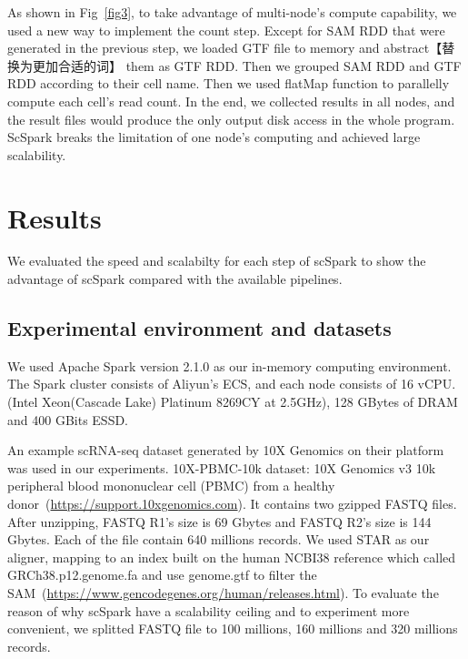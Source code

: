\documentclass[conference]{IEEEtran}
\begin{document}
As shown in Fig~\ref{fig3}, to take advantage of multi-node's compute capability, we used a new way to implement the count step. 
Except for SAM RDD that were generated in the previous step, we loaded GTF file to memory and abstract【替换为更加合适的词】 them as GTF RDD. 
Then we grouped SAM RDD and GTF RDD according to their cell name. 
Then we used flatMap function to parallelly compute each cell's read count. 
In the end, we collected results in all nodes, and the result files would produce the only output disk access in the whole program. 
ScSpark breaks the limitation of one node's computing and achieved large scalability. 

\section{Results}
We evaluated the speed and scalabilty for each step of scSpark to show the advantage of scSpark compared with the available pipelines. 

\subsection{Experimental environment and datasets}
We used Apache Spark version 2.1.0 as our in-memory computing environment.
The Spark cluster consists of Aliyun's ECS, and each node consists of 16 vCPU.
(Intel Xeon(Cascade Lake) Platinum 8269CY at 2.5GHz), 128 GBytes of DRAM and 400 GBits ESSD.

An example scRNA-seq dataset generated by 10X Genomics on their platform was used in our experiments.
10X-PBMC-10k dataset: 10X Genomics v3 10k peripheral blood mononuclear cell (PBMC) from a healthy donor~(\url{https://support.10xgenomics.com}).
It contains two gzipped FASTQ files. After unzipping, FASTQ R1's size is 69 Gbytes and FASTQ R2's size is 144 Gbytes. Each of the file contain 640 millions records.
We used STAR as our aligner, mapping to an index built on the human NCBI38 reference which called GRCh38.p12.genome.fa and use genome.gtf to filter the SAM~(\url{https://www.gencodegenes.org/human/releases.html}).
To evaluate the reason of why scSpark have a scalability ceiling and to experiment more convenient, we splitted FASTQ file to 100 millions, 160 millions and 320 millions records. 
\end{document}
